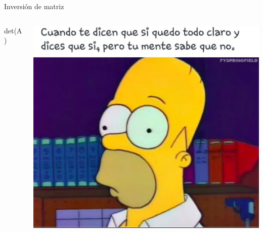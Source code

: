 \documentclass{bredelebeamer}
\begin{document}
\begin{frame}{Inversión de matriz}
\begin{columns}
\begin{column}{0.5\textwidth}
\begin{center}
\LARGE det(A)
\end{center}
\end{column}
\begin{column}{0.5\textwidth}
\begin{center}
\includegraphics[scale=0.25]{images/img40.png}
\end{center}
\end{column}
\end{columns}
\end{frame}
\end{document}

